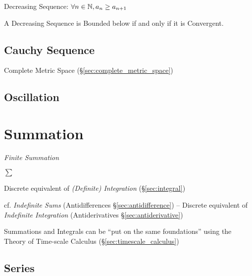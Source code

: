 Decreasing Sequence: $\forall n \in \mathbb{N}, a_n \geq a_{n+1}$

A Decreasing Sequence is Bounded below if and only if it is
Convergent.



\subsection{Cauchy Sequence}\label{sec:cauchy_sequence}

Complete Metric Space (\S\ref{sec:complete_metric_space})



\subsection{Oscillation}\label{sec:oscillation}



\section{Summation}\label{sec:summation}

\emph{Finite Summation}

$\sum$

Discrete equivalent of \emph{(Definite) Integration} (\S\ref{sec:integral})

\fist cf. \emph{Indefinite Sums} (Antidifferences \S\ref{sec:antidifference}) --
Discrete equivalent of \emph{Indefinite Integration} (Antiderivatives
\S\ref{sec:antiderivative})

Summations and Integrals can be ``put on the same foundations'' using the Theory
of Time-scale Calculus (\S\ref{sec:timescale_calculus})



\subsection{Series}\label{sec:series}

